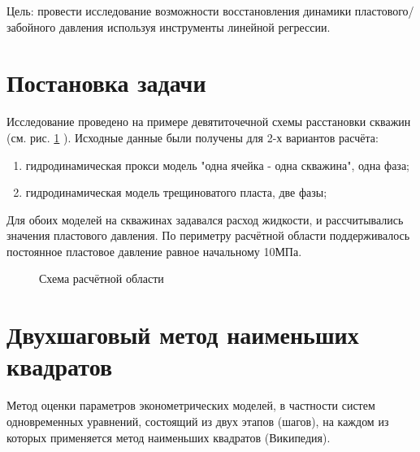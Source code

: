 \documentclass[14pt]{article}
\begin{document}
	Цель: провести исследование возможности восстановления динамики пластового/забойного давления используя инструменты линейной регрессии.
\section{Постановка задачи}
Исследование проведено на примере девятиточечной схемы расстановки скважин (см. рис. \ref{fig:map} ). Исходные данные были получены для 2-х вариантов расчёта:
\begin{enumerate}
	 \item гидродинамическая прокси модель "одна ячейка - одна скважина", одна фаза;
	 \item гидродинамическая модель трещиноватого пласта, две фазы;
\end{enumerate}
Для обоих моделей на скважинах задавался расход жидкости, и рассчитывались значения пластового давления. По периметру расчётной области поддерживалось постоянное пластовое давление равное начальному 10МПа.

\begin{figure}
	\caption{Схема расчётной области}
	\label{fig:map}
\end{figure}

	\section{Двухшаговый метод наименьших квадратов}
Метод оценки параметров эконометрических моделей, в частности систем одновременных уравнений, состоящий из двух этапов (шагов), на каждом из которых применяется метод наименьших квадратов (Википедия).
\end{document}
